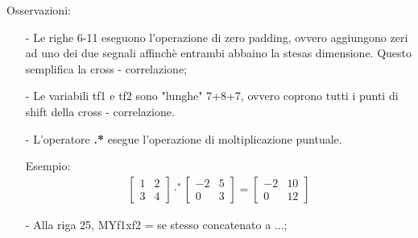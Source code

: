 \documentclass[a4paper, 10pt]{report}
\begin{document}
\noindent Osservazioni:
\begin{itemize}
\item[-] Le righe 6-11 eseguono l'operazione di zero padding, ovvero aggiungono zeri ad uno dei due segnali affinchè entrambi abbaino la stesas dimensione. Questo semplifica la cross - correlazione;
\item[-] Le variabili tf1 e tf2 sono "lunghe" 7+8+7, ovvero coprono tutti i punti di shift della cross - correlazione.
\item[-] L'operatore \textbf{.*} esegue l'operazione di moltiplicazione puntuale.

Esempio:
\begin{align*}
\begin{bmatrix} 1&2\\3&4
\end{bmatrix}
\cdot^*
\begin{bmatrix} -2&5\\0&3
\end{bmatrix}
=
\begin{bmatrix} -2&10\\0&12
\end{bmatrix}
\end{align*}

\item[-] Alla riga 25, MYf1xf2 = se stesso concatenato a ...;
\end{itemize}

\newpage
\end{document}
